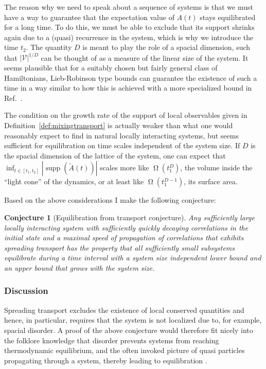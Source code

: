 \documentclass[a4paper,12pt,listof=totoc,index=totoc,bibliography=totoc,headsepline=false,headings=normal,BCOR16.153846mm,DIV12,headinclude,twoside,cleardoublepage=empty,numbers=noenddot,final]{scrreprt}
\theoremstyle{mystyle}
\numberwithin{equation}{section}
\numberwithin{figure}{section}
\numberwithin{lemma}{section}
\numberwithin{theorem}{section}
\numberwithin{corollary}{section}
\numberwithin{definition}{section}
\newtheorem{conjecture}{Conjecture}
\numberwithin{conjecture}{section}
\numberwithin{observation}{section}
\newcommand{\+}{\mkern2mu}
\newcommand{\Vset}{\mathcal{V}}
\DeclareMathOperator{\landauOmega}{\Omega}
\DeclareMathOperator{\1}{\mathds{1}}
\DeclareMathOperator{\supp}{supp}
\begin{document}
The reason why we need to speak about a sequence of systems is that we must have a way to guarantee that the expectation value of $A(t)$ stays equilibrated for a long time.
To do this, we must be able to exclude that its support shrinks again due to a (quasi) recurrence in the system, which is why we introduce the time $t_2$.
The quantity $D$ is meant to play the role of a spacial dimension, such that $|\Vset|^{1/D}$ can be thought of as a measure of the linear size of the system.
It seems plausible that for a suitably chosen but fairly general class of Hamiltonians, Lieb-Robinson type bounds can guarantee the existence of such a time in a way similar to how this is achieved with a more specialized bound in Ref.~\cite{cramer10_1}.

The condition on the growth rate of the support of local observables given in Definition~\ref{def:mixingtransport} is actually weaker than what one would reasonably expect to find in natural locally interacting systems, but seems sufficient for equilibration on time scales independent of the system size.
If $D$ is the spacial dimension of the lattice of the system, one can expect that $\inf_{t \in [t_1,t_2]} |\supp(\tilde{A}(t))|$ scales more like $\landauOmega(t_1^D)$, the volume inside the ``light cone'' of the dynamics, or at least like $\landauOmega(t_1^{D-1})$, its surface area.

Based on the above considerations I make the following conjecture:
\begin{conjecture}[Equilibration from transport conjecture] \label{conj:equilibrationfromtransportconjecture}
  Any sufficiently large locally interacting system with sufficiently quickly decaying correlations in the initial state and a maximal speed of propagation of correlations that exhibits \emph{spreading transport} has the property that all sufficiently small subsystems equilibrate during a time interval with a system size independent lower bound and an upper bound that grows with the system size.
\end{conjecture}


\subsubsection*{Discussion}
%
Spreading transport excludes the existence of local conserved quantities and hence, in particular, requires that the system is not localized due to, for example, spacial disorder.
A proof of the above conjecture would therefore fit nicely into the folklore knowledge that disorder prevents systems from reaching thermodynamic equilibrium, and the often invoked picture of quasi particles propagating through a system, thereby leading to equilibration \cite{Calabrese2007}.
\end{document}
